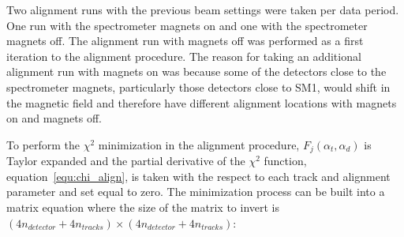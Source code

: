 Two alignment runs with the previous beam settings were taken per data
period.  One run with the spectrometer magnets on and one with the
spectrometer magnets off.  The alignment run with magnets off was
performed as a first iteration to the alignment procedure.  The reason
for taking an additional alignment run with magnets on was because
some of the detectors close to the spectrometer magnets, particularly
those detectors close to SM1, would shift in the magnetic field and
therefore have different alignment locations with magnets on and
magnets off.  \par

To perform the $\chi^2$ minimization in the alignment procedure,
$F_j(\alpha_t, \alpha_d)$ is Taylor expanded and the partial
derivative of the $\chi^2$ function, equation~\ref{equ:chi_align}, is
taken with the respect to each track and alignment parameter and set
equal to zero.  The minimization process can be built into a matrix
equation where the size of the matrix to invert is
$(4n_{detector}+4n_{tracks})\times(4n_{detector}+4n_{tracks})$: \par
%
